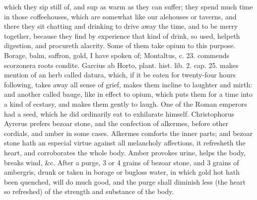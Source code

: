 which they sip still of, and sup as warm as they can suffer; they spend
much time in those coffeehouses, which are somewhat like our alehouses
or taverns, and there they sit chatting and drinking to drive away the
time, and to be merry together, because they find by experience that
kind of drink, so used, helpeth digestion, and procureth alacrity. Some
of them take opium to this purpose.
Borage, balm, saffron, gold, I have spoken of; Montaltus, c. 23.
commends scorzonera roots condite. Garcius ab Horto, plant. hist. lib.
2. cap. 25. makes mention of an herb called datura, which, if it
be eaten for twenty-four hours following, takes away all sense of
grief, makes them incline to laughter and mirth: and another called
bauge, like in effect to opium, which puts them for a time into a kind
of ecstasy, and makes them gently to laugh. One of the Roman emperors
had a seed, which he did ordinarily eat to exhilarate himself.
Christophorus Ayrerus prefers bezoar stone, and the confection of
alkermes, before other cordials, and amber in some cases.
Alkermes comforts the inner parts; and bezoar stone hath an
especial virtue against all melancholy affections, it refresheth
the heart, and corroborates the whole body. Amber provokes urine,
helps the body, breaks wind, \&c. After a purge, 3 or 4 grains of bezoar
stone, and 3 grains of ambergris, drunk or taken in borage or bugloss
water, in which gold hot hath been quenched, will do much good, and the
purge shall diminish less (the heart so refreshed) of the strength and
substance of the body.

